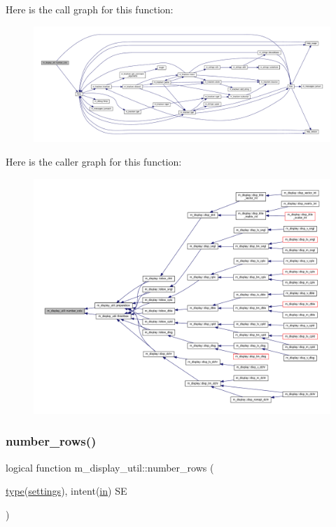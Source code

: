 Here is the call graph for this function\+:
\nopagebreak
\begin{figure}[H]
\begin{center}
\leavevmode
\includegraphics[width=350pt]{namespacem__display__util_a837cfbf5c0d097da743220ac0acfaec8_cgraph}
\end{center}
\end{figure}
Here is the caller graph for this function\+:
\nopagebreak
\begin{figure}[H]
\begin{center}
\leavevmode
\includegraphics[width=350pt]{namespacem__display__util_a837cfbf5c0d097da743220ac0acfaec8_icgraph}
\end{center}
\end{figure}
\mbox{\label{namespacem__display__util_a7a886d21010f7a6f0f8101d2b26fd97d}} 
\subsubsection{\texorpdfstring{number\+\_\+rows()}{number\_rows()}}
{\footnotesize\ttfamily logical function m\+\_\+display\+\_\+util\+::number\+\_\+rows (\begin{DoxyParamCaption}\item[{\hyperlink{stop__watch_83_8txt_a70f0ead91c32e25323c03265aa302c1c}{type}(\hyperlink{structm__display__util_1_1settings}{settings}), intent(\hyperlink{M__journal_83_8txt_afce72651d1eed785a2132bee863b2f38}{in})}]{SE }\end{DoxyParamCaption})\hspace{0.3cm}{\ttfamily [private]}}



